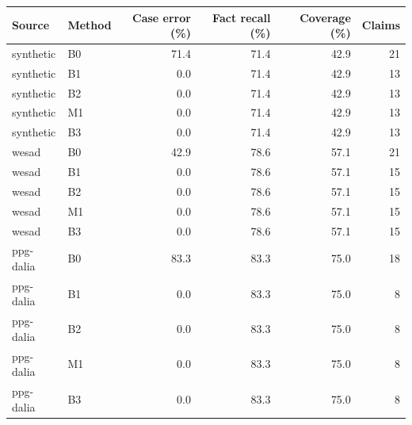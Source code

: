 \begin{tabular}{llrrrr}
\toprule
Source & Method & Case error (\%) & Fact recall (\%) & Coverage (\%) & Claims \\
\midrule
synthetic & B0 & 71.4 & 71.4 & 42.9 & 21 \\
synthetic & B1 & 0.0 & 71.4 & 42.9 & 13 \\
synthetic & B2 & 0.0 & 71.4 & 42.9 & 13 \\
synthetic & M1 & 0.0 & 71.4 & 42.9 & 13 \\
synthetic & B3 & 0.0 & 71.4 & 42.9 & 13 \\
wesad & B0 & 42.9 & 78.6 & 57.1 & 21 \\
wesad & B1 & 0.0 & 78.6 & 57.1 & 15 \\
wesad & B2 & 0.0 & 78.6 & 57.1 & 15 \\
wesad & M1 & 0.0 & 78.6 & 57.1 & 15 \\
wesad & B3 & 0.0 & 78.6 & 57.1 & 15 \\
ppg-dalia & B0 & 83.3 & 83.3 & 75.0 & 18 \\
ppg-dalia & B1 & 0.0 & 83.3 & 75.0 & 8 \\
ppg-dalia & B2 & 0.0 & 83.3 & 75.0 & 8 \\
ppg-dalia & M1 & 0.0 & 83.3 & 75.0 & 8 \\
ppg-dalia & B3 & 0.0 & 83.3 & 75.0 & 8 \\
\bottomrule
\end{tabular}

